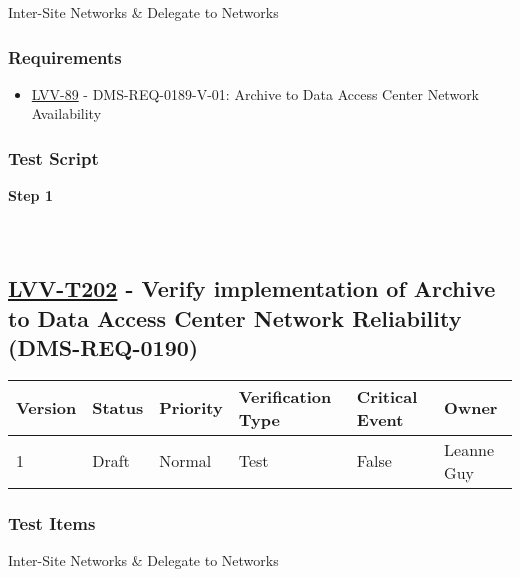 Inter-Site Networks \& Delegate to Networks

\hypertarget{requirements-101}{%
\subsubsection{Requirements}\label{requirements-101}}

\begin{itemize}
\tightlist
\item
  \href{https://jira.lsstcorp.org/browse/LVV-89}{LVV-89} -
  DMS-REQ-0189-V-01: Archive to Data Access Center Network Availability
\end{itemize}

\hypertarget{test-script-101}{%
\subsubsection{Test Script}\label{test-script-101}}

\textbf{Step 1}\\
~\\
~\\

\hypertarget{lvv-t202---verify-implementation-of-archive-to-data-access-center-network-reliability-dms-req-0190}{%
\subsection{\texorpdfstring{\href{https://jira.lsstcorp.org/secure/Tests.jspa\#/testCase/LVV-T202}{LVV-T202}
- Verify implementation of Archive to Data Access Center Network
Reliability
(DMS-REQ-0190)}{LVV-T202 - Verify implementation of Archive to Data Access Center Network Reliability (DMS-REQ-0190)}}\label{lvv-t202---verify-implementation-of-archive-to-data-access-center-network-reliability-dms-req-0190}}

\begin{longtable}[]{@{}llllll@{}}
\toprule
Version & Status & Priority & Verification Type & Critical Event &
Owner\tabularnewline
\midrule
\endhead
1 & Draft & Normal & Test & False & Leanne Guy\tabularnewline
\bottomrule
\end{longtable}

\hypertarget{test-items-102}{%
\subsubsection{Test Items}\label{test-items-102}}

Inter-Site Networks \& Delegate to Networks

